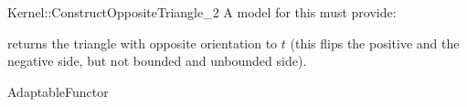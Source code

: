\begin{ccRefFunctionObjectConcept}{Kernel::ConstructOppositeTriangle_2}
A model for this must provide:


       {returns the triangle with opposite orientation to $t$
        (this flips the positive and the negative side, but
        not bounded and unbounded side).}

\ccRefines
AdaptableFunctor

\ccSeeAlso
{} \\

\end{ccRefFunctionObjectConcept}
